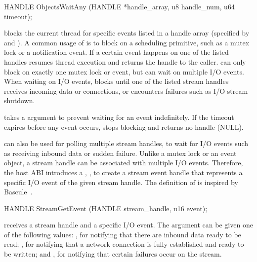 \begin{paldef}
HANDLE ObjectsWaitAny (HANDLE *handle_array,
                       u8 handle_num, u64 timeout);
\end{paldef}


 blocks the current thread for specific events listed in
a handle array (specified by  and ).
A common usage of 
is to block on a scheduling primitive,
such as a mutex lock or a notification event.
If a certain event happens on one of the listed handles
 resumes thread execution
and returns the handle to the caller. 
 can only block on exactly one mutex lock or event, but can wait on
multiple I/O events.
When waiting on I/O events,
 blocks until one of the listed stream handles receives incoming data or connections,
or encounters failures such as I/O stream shutdown.


 takes a  argument to prevent waiting for an event indefinitely.
If the timeout expires before any event occurs,
 stops blocking
and returns no handle (NULL).


 can also be used for polling multiple stream handles, to wait for I/O events
such as receiving inbound data or sudden failure.
Unlike a mutex lock or an event object, a stream handle can be associated
with multiple I/O events.
Therefore, the host ABI introduces a \hostapi{}, , to create a stream event handle
that represents a specific I/O event of the given stream handle.
The definition of  is inspired by Bascule~\cite{baumann13bascule}.


\begin{paldef}
HANDLE StreamGetEvent (HANDLE stream_handle, u16 event);
\end{paldef}


 receives a stream handle and a specific I/O event.
The  argument can be given
one of the following values:
, for notifying that there are inbound data ready to be read;
, for notifying
that a network connection is fully established
and ready to be written;
and , for notifying that certain failures occur on the stream.

